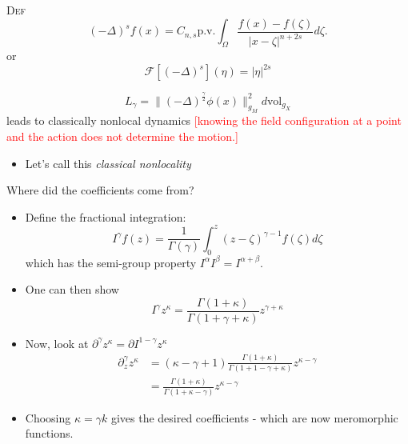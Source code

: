 \documentclass[10pt,xcolor=svgnames]{beamer} %
\newcommand{\COMMENT}[1]{\textcolor{red}{[#1]}}
\begin{document}
\begin{frame}
    \begin{exampleblock}{\textsc{Def}}
    \begin{equation*}
    (-\Delta)^s f(x) = C_{n,s}\text{p.v.}\int_{\Omega}\frac{f(x)-f(\zeta)}{|x-\zeta|^{n+2s}}d\zeta.
\end{equation*}
or
$$
\mathcal F[(-\Delta)^s](\eta) = |\eta|^{2s}
$$
\end{exampleblock}
\pause
    $$
    L_\gamma = \|(-\Delta)^{\frac{\gamma}{2}} \phi(x)\|^2_{g_M} d\text{vol}_{g_X}
    $$ 
leads to classically nonlocal dynamics \COMMENT{knowing the field configuration at a point and the action does not determine the motion.}
\pause 
\begin{itemize}
    \item Let's call this \emph{classical nonlocality} 
\end{itemize}
\end{frame}



\appendix

\begin{frame}
    Where did the coefficients come from?
    \begin{itemize}
     
        \pause
        \item Define the fractional integration:
        $$
        I^\gamma f(z)=\frac{1}{\Gamma(\gamma)}\int_0^z (z-\zeta)^{\gamma-1}f(\zeta)d\zeta
        $$
        \pause which has the semi-group property $I^{\alpha}I^{\beta}=I^{\alpha+\beta}$.
        \pause
        \item One can then show
        $$
        I^{\gamma} z^{\kappa} = \frac{\Gamma(1+\kappa)}{\Gamma(1+\gamma+\kappa)} z^{\gamma+\kappa}
        $$
        \pause
        \item Now, look at $\partial^\gamma z^{\kappa}=\partial I^{1-\gamma} z^{\kappa}$
        \begin{align*}
        \partial_z ^\gamma z^\kappa &= (\kappa-\gamma+1)\frac{\Gamma(1+\kappa)}{\Gamma(1+1-\gamma+\kappa)}z^{\kappa-\gamma}\\
        &=\frac{\Gamma(1+\kappa)}{\Gamma(1+\kappa-\gamma)}z^{\kappa-\gamma}
        \end{align*}
        \pause
        \item Choosing $\kappa = \gamma k$ gives the desired coefficients - which are now meromorphic functions.
    \end{itemize}
\end{frame}
\end{document}
